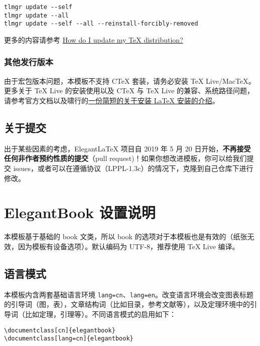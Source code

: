 \documentclass[lang=cn,10pt]{elegantbook}
\begin{document}
\begin{lstlisting}
tlmgr update --self 
tlmgr update --all
tlmgr update --self --all --reinstall-forcibly-removed
\end{lstlisting}

更多的内容请参考 \href{https://tex.stackexchange.com/questions/55437/how-do-i-update-my-tex-distribution}{How do I update my \TeX{} distribution?}

\subsection{其他发行版本}

由于宏包版本问题，本模板不支持 C\TeX{} 套装，请务必安装 TeX Live/Mac\TeX{}。更多关于 \TeX{} Live 的安装使用以及 C\TeX{} 与 \TeX{} Live 的兼容、系统路径问题，请参考官方文档以及啸行的\href{https://github.com/OsbertWang/install-latex-guide-zh-cn/releases/}{一份简短的关于安装 \LaTeX{} 安装的介绍}。


\section{关于提交}

出于某些因素的考虑，Elegant\LaTeX{} 项目自 2019 年 5 月 20 日开始，\textbf{不再接受任何非作者预约性质的提交}（pull request)！如果你想改进模板，你可以给我们提交 issues，或者可以在遵循协议（LPPL-1.3c）的情况下，克隆到自己仓库下进行修改。


\chapter{ElegantBook 设置说明}

本模板基于基础的 book 文类，所以 book 的选项对于本模板也是有效的（纸张无效，因为模板有设备选项）。默认编码为 UTF-8，推荐使用 \TeX{} Live 编译。

\section{语言模式}
本模板内含两套基础语言环境 \lstinline{lang=cn}、\lstinline{lang=en}。改变语言环境会改变图表标题的引导词（图，表），文章结构词（比如目录，参考文献等），以及定理环境中的引导词（比如定理，引理等）。不同语言模式的启用如下：
\begin{lstlisting}
\documentclass[cn]{elegantbook} 
\documentclass[lang=cn]{elegantbook}
\end{lstlisting}
\end{document}
